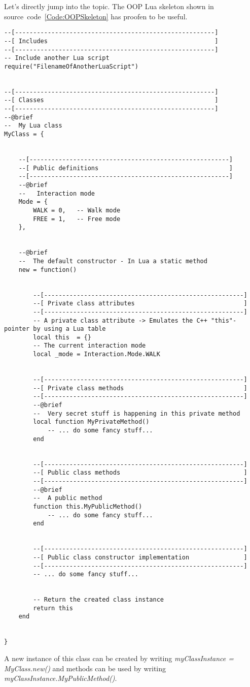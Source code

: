 Let's directly jump into the topic. The OOP Lua skeleton shown in source~code~\ref{Code:OOPSkeleton} has proofen to be useful.
\begin{lstlisting}[label=Code:OOPSkeleton,caption={Object-oriented programming (OOP) Lua skeleton}]
--[-------------------------------------------------------]
--[ Includes                                              ]
--[-------------------------------------------------------]
-- Include another Lua script
require("FilenameOfAnotherLuaScript")


--[-------------------------------------------------------]
--[ Classes                                               ]
--[-------------------------------------------------------]
--@brief
--  My Lua class
MyClass = {


	--[-------------------------------------------------------]
	--[ Public definitions                                    ]
	--[-------------------------------------------------------]
	--@brief
	--   Interaction mode
	Mode = {
		WALK = 0,	-- Walk mode
		FREE = 1,	-- Free mode
	},


	--@brief
	--  The default constructor - In Lua a static method
	new = function()


		--[-------------------------------------------------------]
		--[ Private class attributes                              ]
		--[-------------------------------------------------------]
		-- A private class attribute -> Emulates the C++ "this"-pointer by using a Lua table
		local this	= {}
		-- The current interaction mode
		local _mode	= Interaction.Mode.WALK


		--[-------------------------------------------------------]
		--[ Private class methods                                 ]
		--[-------------------------------------------------------]
		--@brief
		--  Very secret stuff is happening in this private method
		local function MyPrivateMethod()
			-- ... do some fancy stuff...
		end


		--[-------------------------------------------------------]
		--[ Public class methods                                  ]
		--[-------------------------------------------------------]
		--@brief
		--  A public method
		function this.MyPublicMethod()
			-- ... do some fancy stuff...
		end


		--[-------------------------------------------------------]
		--[ Public class constructor implementation               ]
		--[-------------------------------------------------------]
		-- ... do some fancy stuff...


		-- Return the created class instance
		return this
	end


}
\end{lstlisting}
A new instance of this class can be created by writing \emph{myClassInstance = MyClass.new()} and methods can be used by writing \emph{myClassInstance.MyPublicMethod()}.

